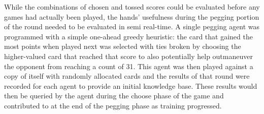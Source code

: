 While the combinations of chosen and tossed scores could be evaluated before any
games had actually been played,
the hands' usefulness during the pegging portion of the round needed to be
evaluated in semi real-time.
%
A single pegging agent was programmed with a simple one-ahead greedy heuristic:
the card that gained the most points when played next was selected with ties
broken by choosing the higher-valued card that reached that score
to also potentially help outmaneuver the opponent from reaching a count of 31.
%
This agent was then played against a copy of itself with randomly allocated
cards and the results of that round were recorded for each agent to provide an
initial knowledge base.
%
These results would then be queried by the agent during the choose phase of the
game and contributed to at the end of the pegging phase as training progressed.

